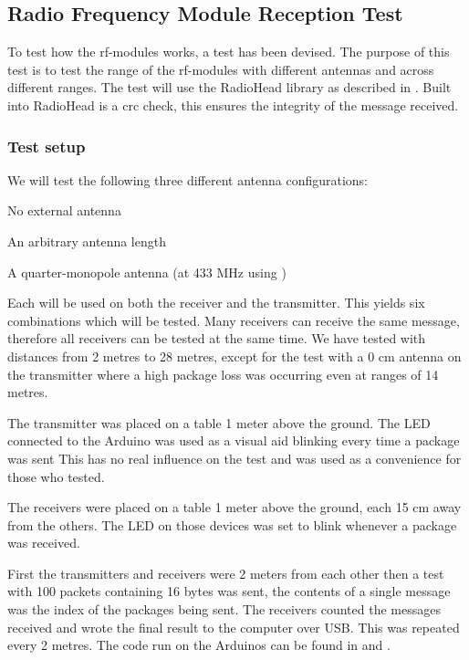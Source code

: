 \subsection{Radio Frequency Module Reception Test} %
\label{cha:radio_frequency_module_reception_test}
To test how the \gls{rf}-modules works, a test has been devised. 
The purpose of this test is to test the range of the \gls{rf}-modules with different antennas and across different ranges. 
The test will use the RadioHead library as described in . 
Built into RadioHead is a \gls{crc} check, this ensures the integrity of the message received. 

\subsubsection*{Test setup}
We will test the following three different antenna configurations: 
\begin{description}[labelindent=\parindent, labelwidth=\widthof{\bfseries 17.3 cm}, align=parright]
    \item[0 cm] No external antenna
    \item[12 cm] An arbitrary antenna length
    \item[17.3 cm] A quarter-monopole antenna (at 433 MHz using )  
\end{description}
Each will be used on both the receiver and the transmitter. 
This yields six combinations which will be tested. 
Many receivers can receive the same message, therefore all receivers can be tested at the same time. 
We have tested with distances from 2 metres to 28 metres, except for the test with a 0 cm antenna on the transmitter where a high package loss was occurring even at ranges of 14 metres. 

The transmitter was placed on a table 1 meter above the ground.
The LED connected to the Arduino was used as a visual aid blinking every time a package was sent
This has no real influence on the test and was used as a convenience for those who tested.

The receivers were placed on a table 1 meter above the ground, each 15 cm away from the others.
The LED on those devices was set to blink whenever a package was received.

First the transmitters and receivers were 2 meters from each other then a test with 100 packets containing 16 bytes was sent, the contents of a single message was the index of the packages being sent. 
The receivers counted the messages received and wrote the final result to the computer over USB. 
This was repeated every 2 metres. 
The code run on the Arduinos can be found in  and .  


